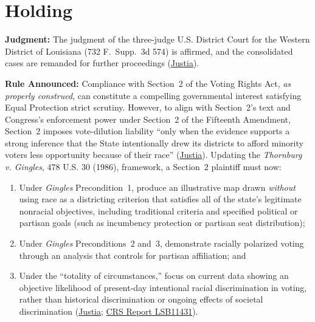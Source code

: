 \documentclass[12pt]{article}
\begin{document}
\section{Holding}

\textbf{Judgment:} The judgment of the three-judge U.S. District Court for the Western District of Louisiana (732 F.~Supp.~3d 574) is affirmed, and the consolidated cases are remanded for further proceedings (\href{https://supreme.justia.com/cases/federal/us/608/24-109/}{Justia}).

\textbf{Rule Announced:} Compliance with Section~2 of the Voting Rights Act, \textit{as properly construed}, can constitute a compelling governmental interest satisfying Equal Protection strict scrutiny. However, to align with Section~2's text and Congress's enforcement power under Section~2 of the Fifteenth Amendment, Section~2 imposes vote-dilution liability ``only when the evidence supports a strong inference that the State intentionally drew its districts to afford minority voters less opportunity because of their race'' (\href{https://supreme.justia.com/cases/federal/us/608/24-109/}{Justia}). Updating the \textit{Thornburg v. Gingles}, 478 U.S. 30 (1986), framework, a Section~2 plaintiff must now:
\begin{enumerate}
    \item Under \textit{Gingles} Precondition~1, produce an illustrative map drawn \textit{without} using race as a districting criterion that satisfies all of the state's legitimate nonracial objectives, including traditional criteria and specified political or partisan goals (such as incumbency protection or partisan seat distribution);
    \item Under \textit{Gingles} Preconditions~2 and~3, demonstrate racially polarized voting through an analysis that controls for partisan affiliation; and
    \item Under the ``totality of circumstances,'' focus on current data showing an objective likelihood of present-day intentional racial discrimination in voting, rather than historical discrimination or ongoing effects of societal discrimination (\href{https://supreme.justia.com/cases/federal/us/608/24-109/}{Justia}; \href{https://www.everycrsreport.com/reports/LSB11431.html}{CRS Report LSB11431}).
\end{enumerate}
\end{document}
